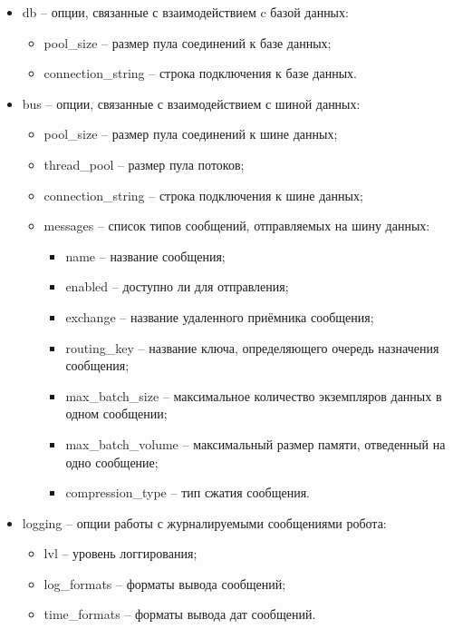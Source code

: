 \begin{itemize}
\begin{itemize}
\end{itemize}
\item db -- опции, связанные с взаимодействием c базой данных:
\begin{itemize}
\item pool\_size -- размер пула соединений к базе данных;
\item connection\_string -- строка подключения к базе данных.
\end{itemize}
\item bus -- опции, связанные с взаимодействием с шиной данных:
\begin{itemize}
\item pool\_size -- размер пула соединений к шине данных;
\item thread\_pool -- размер пула потоков;
\item connection\_string -- строка подключения к шине данных;
\item messages -- список типов сообщений, отправляемых на шину данных:
\begin{itemize}
\item name -- название сообщения;
\item enabled -- доступно ли для отправления;
\item exchange -- название удаленного приёмника сообщения;
\item routing\_key -- название ключа, определяющего очередь назначения сообщения;
\item max\_batch\_size -- максимальное количество экземпляров данных в одном сообщении;
\item max\_batch\_volume -- максимальный размер памяти, отведенный на одно сообщение;
\item compression\_type -- тип сжатия сообщения.
\end{itemize}
\end{itemize}
\item logging -- опции работы с журналируемыми сообщениями робота:
\begin{itemize}
\item lvl -- уровень логгирования;
\item log\_formats -- форматы вывода сообщений;
\item time\_formats -- форматы вывода дат сообщений.
\end{itemize}
\end{itemize}

